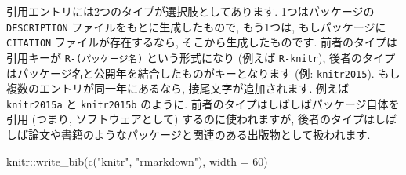 \documentclass[
  11pt,
]{bxjsreport}
\newenvironment{Shaded}{\begin{snugshade}}{\end{snugshade}}
\newcommand{\AttributeTok}[1]{\textcolor[rgb]{0.77,0.63,0.00}{#1}}
\newcommand{\DecValTok}[1]{\textcolor[rgb]{0.00,0.00,0.81}{#1}}
\newcommand{\FunctionTok}[1]{\textcolor[rgb]{0.00,0.00,0.00}{#1}}
\newcommand{\NormalTok}[1]{#1}
\newcommand{\SpecialCharTok}[1]{\textcolor[rgb]{0.00,0.00,0.00}{#1}}
\newcommand{\StringTok}[1]{\textcolor[rgb]{0.31,0.60,0.02}{#1}}
\begin{document}
引用エントリには2つのタイプが選択肢としてあります. 1つはパッケージの \texttt{DESCRIPTION} ファイルをもとに生成したもので, もう1つは, もしパッケージに \texttt{CITATION} ファイルが存在するなら, そこから生成したものです. 前者のタイプは引用キーが \texttt{R-(パッケージ名)} という形式になり (例えば \texttt{R-knitr}), 後者のタイプはパッケージ名と公開年を結合したものがキーとなります (例: \texttt{knitr2015}). もし複数のエントリが同一年にあるなら, 接尾文字が追加されます. 例えば \texttt{knitr2015a} と \texttt{knitr2015b} のように. 前者のタイプはしばしばパッケージ自体を引用 (つまり, ソフトウェアとして) するのに使われますが, 後者のタイプはしばしば論文や書籍のようなパッケージと関連のある出版物として扱われます.

\begin{Shaded}
\begin{Highlighting}[numbers=left,,]
\NormalTok{knitr}\SpecialCharTok{::}\FunctionTok{write\_bib}\NormalTok{(}\FunctionTok{c}\NormalTok{(}\StringTok{"knitr"}\NormalTok{, }\StringTok{"rmarkdown"}\NormalTok{), }\AttributeTok{width =} \DecValTok{60}\NormalTok{)}
\end{Highlighting}
\end{Shaded}
\end{document}

